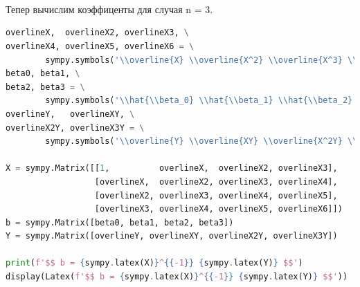 \documentclass[a4paper, 14pt]{extarticle}
\begin{document}
\vfill\newpage

\begin{center}
     \\
\end{center}

\begin{center}
     \\
\end{center}

\begin{center}
     \\
\end{center}

\newpage

Тепер вычислим коэффиценты для случая n = 3.

\begin{center}
    \begin{lstlisting}[language=Python]
overlineX,  overlineX2, overlineX3, \
overlineX4, overlineX5, overlineX6 = \
        sympy.symbols('\\overline{X} \\overline{X^2} \\overline{X^3} \\overline{X^4} \\overline{X^5} \\overline{X^6}')
beta0, beta1, \
beta2, beta3 = \
        sympy.symbols('\\hat{\\beta_0} \\hat{\\beta_1} \\hat{\\beta_2} \\hat{\\beta_3}')
overlineY,   overlineXY, \
overlineX2Y, overlineX3Y = \
        sympy.symbols('\\overline{Y} \\overline{XY} \\overline{X^2Y} \\overline{X^3Y}')

X = sympy.Matrix([[1,          overlineX,  overlineX2, overlineX3], 
                  [overlineX,  overlineX2, overlineX3, overlineX4],
                  [overlineX2, overlineX3, overlineX4, overlineX5],
                  [overlineX3, overlineX4, overlineX5, overlineX6]])
b = sympy.Matrix([beta0, beta1, beta2, beta3])
Y = sympy.Matrix([overlineY, overlineXY, overlineX2Y, overlineX3Y])

print(f'$$ b = {sympy.latex(X)}^{{-1}} {sympy.latex(Y)} $$')
display(Latex(f'$$ b = {sympy.latex(X)}^{{-1}} {sympy.latex(Y)} $$'))
    \end{lstlisting}
\end{center}
\end{document}
